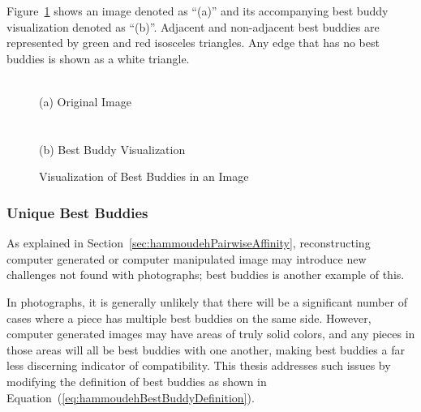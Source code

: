 \documentclass{report}
\def\eref#1{(\ref{#1})}
\begin{document}
Figure~\ref{fig:bestBuddyVisualization} shows an image denoted as ``(a)'' and its accompanying best buddy visualization denoted as ``(b)''. Adjacent and non-adjacent best buddies are represented by green and red isosceles triangles.  Any edge that has no best buddies is shown as a white triangle.  

\begin{figure}
\centering
{}
\\
(a) Original Image
\\ ~\\
\\
(b) Best Buddy Visualization
\caption{Visualization of Best Buddies in an Image}
\label{fig:bestBuddyVisualization}
\end{figure}

\subsubsection{Unique Best Buddies}\label{sec:improvedBestBuddies}

As explained in Section~\ref{sec:hammoudehPairwiseAffinity}, reconstructing computer generated or computer manipulated image may introduce new challenges not found with photographs; best buddies is another example of this.

In photographs, it is generally unlikely that there will be a significant number of cases where a piece has multiple best buddies on the same side.  However, computer generated images may have areas of truly solid colors, and any pieces in those areas will all be best buddies with one another, making best buddies a far less discerning indicator of compatibility.  This thesis addresses such issues by modifying the definition of best buddies as shown in Equation~\eref{eq:hammoudehBestBuddyDefinition}.
\end{document}
